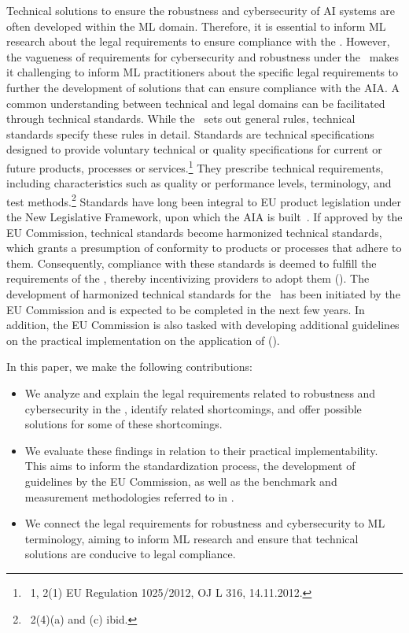 Technical solutions to ensure the robustness and cybersecurity of AI systems are often developed within the ML domain. 
%
Therefore, it is essential to inform ML research about the legal requirements to ensure compliance with the \EUAIAct.
%
However, the vagueness of requirements for cybersecurity and robustness under the \EUAIAct\ makes it challenging to inform ML practitioners about the specific legal requirements to further the development of solutions that can ensure compliance with the AIA.
% 
A common understanding between technical and legal
domains can be facilitated through technical standards. 
% 
While the \EUAIAct\ sets out general rules, technical standards specify these rules in detail. 
%
Standards are technical specifications designed to provide voluntary technical or quality specifications for current or future products, processes
or services.\footnote{\Artx~1, 2(1) EU Regulation 1025/2012, OJ L 316, 14.11.2012.}
%
They prescribe technical requirements, 
% 
including characteristics such as quality or performance levels, terminology, and test methods.\footnote{\Artx\ 2(4)(a) and (c) ibid.}
%
Standards have long been integral to EU product legislation under the New Legislative Framework, upon which the AIA is built~\citep{gorywoda2009new}.
%
If approved by the EU Commission, technical standards become harmonized technical standards, which grants a presumption of conformity to products or processes that adhere to them. Consequently, compliance with these standards is deemed to fulfill the requirements of the \EUAIAct, thereby incentivizing providers to adopt them  ().
%
The development of harmonized technical standards for the \EUAIAct\ has been initiated by the EU Commission
and is expected to be completed in the next few years.
%
In addition, the EU Commission is also tasked with developing additional guidelines on the practical implementation on the application of  ().



In this paper, we make the following contributions:
%
\begin{itemize}
    \item We analyze and explain the legal requirements related to robustness and cybersecurity in the \EUAIAct, identify related shortcomings, and offer possible solutions for
    some of these shortcomings. 
    \item 
    We evaluate these findings in relation to their practical implementability.
    This aims to inform the standardization process, the development of guidelines by the EU Commission, as well as the benchmark and measurement methodologies referred to in .
    \item We connect the legal requirements for robustness and cybersecurity to ML terminology, aiming to inform ML research and ensure that technical solutions are conducive to legal compliance.
\end{itemize}



